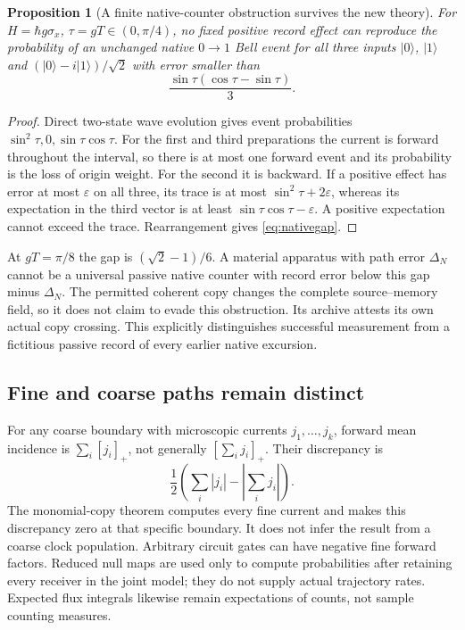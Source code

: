 \documentclass[11pt]{article}
\newtheorem{proposition}[theorem]{Proposition}
\theoremstyle{definition}\newtheorem{definition}[theorem]{Definition}
\theoremstyle{remark}\newtheorem{remark}[theorem]{Remark}
\begin{document}
\begin{proposition}[A finite native-counter obstruction survives the new theory]
For $H=\hbar g\sigma_x$, $\tau=gT\in(0,\pi/4)$, no fixed positive record effect can reproduce the probability of an unchanged native $0\to1$ Bell event for all three inputs $|0\rangle$, $|1\rangle$ and $(|0\rangle-i|1\rangle)/\sqrt2$ with error smaller than
\begin{equation}
 \frac{\sin\tau(\cos\tau-\sin\tau)}{3}.
 \label{eq:nativegap}
\end{equation}
\end{proposition}
\begin{proof}
Direct two-state wave evolution gives event probabilities $\sin^2\tau,0,\sin\tau\cos\tau$. For the first and third preparations the current is forward throughout the interval, so there is at most one forward event and its probability is the loss of origin weight. For the second it is backward. If a positive effect has error at most $\varepsilon$ on all three, its trace is at most $\sin^2\tau+2\varepsilon$, whereas its expectation in the third vector is at least $\sin\tau\cos\tau-\varepsilon$. A positive expectation cannot exceed the trace. Rearrangement gives \eqref{eq:nativegap}.
\end{proof}
At $gT=\pi/8$ the gap is $(\sqrt2-1)/6$. A material apparatus with path error $\Delta_N$ cannot be a universal passive native counter with record error below this gap minus $\Delta_N$. The permitted coherent copy changes the complete source--memory field, so it does not claim to evade this obstruction. Its archive attests its own actual copy crossing. This explicitly distinguishes successful measurement from a fictitious passive record of every earlier native excursion.

\subsection{Fine and coarse paths remain distinct}
For any coarse boundary with microscopic currents $j_1,\ldots,j_k$, forward mean incidence is $\sum_i[j_i]_+$, not generally $[\sum_i j_i]_+$. Their discrepancy is
\[
 \frac12\left(\sum_i|j_i|-\left|\sum_i j_i\right|\right).
\]
The monomial-copy theorem computes every fine current and makes this discrepancy zero at that specific boundary. It does not infer the result from a coarse clock population. Arbitrary circuit gates can have negative fine forward factors. Reduced null maps are used only to compute probabilities after retaining every receiver in the joint model; they do not supply actual trajectory rates. Expected flux integrals likewise remain expectations of counts, not sample counting measures.
\end{document}

